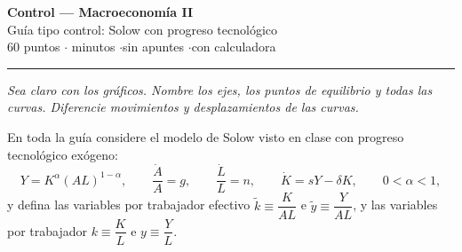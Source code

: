 \documentclass[11pt]{article}
\begin{document}
\begin{center}
{\Large\bfseries Control --- Macroeconomía II}\\[4pt]
{\large Guía tipo control: Solow con progreso tecnológico}\\[4pt]
60 puntos \quad$\cdot$ minutos \quad$\cdot$\quad sin apuntes \quad$\cdot$\quad con calculadora
\end{center}

\hrule
\medskip

\textit{Sea claro con los gráficos. Nombre los ejes, los puntos de equilibrio y todas las curvas. Diferencie movimientos y desplazamientos de las curvas.}

En toda la guía considere el modelo de Solow visto en clase con progreso tecnológico exógeno:
\[
Y = K^{\alpha}(AL)^{1-\alpha}, \qquad \frac{\dot A}{A} = g, \qquad \frac{\dot L}{L} = n, \qquad \dot K = sY - \delta K, \qquad 0<\alpha<1,
\]
y defina las variables por trabajador efectivo $\tilde k \equiv \dfrac{K}{AL}$ e $\tilde y \equiv \dfrac{Y}{AL}$, y las variables por trabajador $k \equiv \dfrac{K}{L}$ e $y \equiv \dfrac{Y}{L}$.
\end{document}

